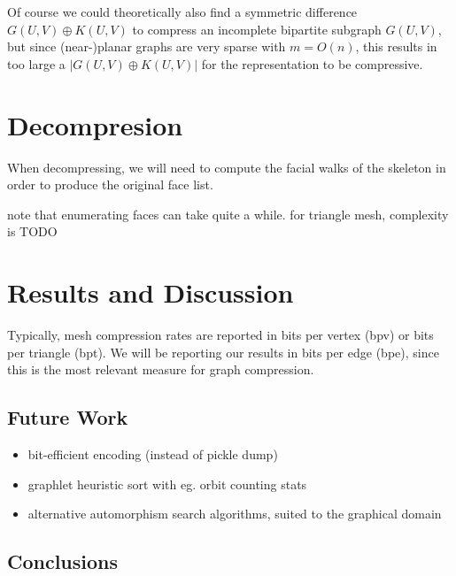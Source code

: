 \documentclass{egpubl}
\begin{document}
Of course we could theoretically also find a symmetric difference $G(U,V) \oplus K(U,V)$ to compress an incomplete bipartite subgraph $G(U,V)$, but since (near-)planar graphs are very sparse with $m = O(n)$, this results in too large a $|G(U,V) \oplus K(U,V)|$ for the representation to be compressive. %



\section{Decompresion}

When decompressing, we will need to compute the facial walks of the skeleton in order to produce the original face list.

note that enumerating faces can take quite a while. for triangle mesh, complexity is TODO %

\section{Results and Discussion}


Typically, mesh compression rates are reported in bits per vertex (bpv) or bits per triangle (bpt). We will be reporting our results in bits per edge (bpe), since this is the most relevant measure for graph compression.


\subsection{Future Work}
\begin{itemize}
        \item bit-efficient encoding (instead of pickle dump)
        \item graphlet heuristic sort with eg. orbit counting stats
        \item alternative automorphism search algorithms, suited to the graphical domain
\end{itemize}

\subsection{Conclusions}



%



\end{document}
